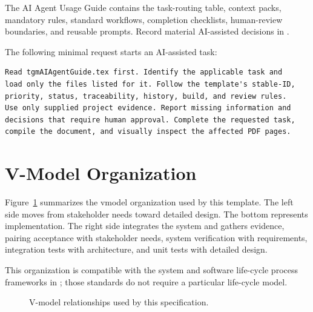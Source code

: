 The AI Agent Usage Guide contains the task-routing table, context packs,
mandatory rules, standard workflows, completion checklists, human-review
boundaries, and reusable prompts. Record material AI-assisted decisions in
.

The following minimal request starts an AI-assisted task:

\begin{verbatim}
Read tgmAIAgentGuide.tex first. Identify the applicable task and
load only the files listed for it. Follow the template's stable-ID,
priority, status, traceability, history, build, and review rules.
Use only supplied project evidence. Report missing information and
decisions that require human approval. Complete the requested task,
compile the document, and visually inspect the affected PDF pages.
\end{verbatim}

\section{V-Model Organization}
Figure~\ref{Figure:VModel} summarizes the \gls{vmodel} organization used by
this template. The left side moves from stakeholder needs toward detailed
design. The bottom represents implementation. The right side integrates the
system and gathers evidence, pairing acceptance with stakeholder needs, system
verification with requirements, integration tests with architecture, and unit
tests with detailed design.

This organization is compatible with the system and software life-cycle
process frameworks in \cite{ISO15288,ISO12207}; those standards do not require
a particular life-cycle model.

\begin{figure}[htbp]
\centering

\caption{V-model relationships used by this specification.}
\label{Figure:VModel}
\end{figure}
